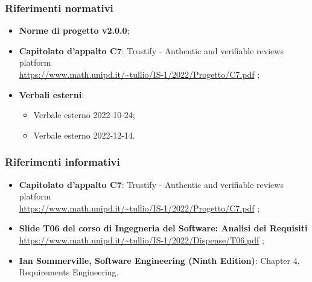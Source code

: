 \subsubsection{Riferimenti normativi}
\begin{itemize}
    \item \textbf{Norme di progetto v2.0.0};
    \item \textbf{Capitolato d'appalto C7}: Trustify - Authentic and verifiable reviews platform \\
          \url{https://www.math.unipd.it/~tullio/IS-1/2022/Progetto/C7.pdf}
          \hfill{};
    \item \textbf{Verbali esterni}:
          \begin{itemize}
              \item Verbale esterno 2022-10-24;
              \item Verbale esterno 2022-12-14.
          \end{itemize}
\end{itemize}
\subsubsection{Riferimenti informativi}
\begin{itemize}
    \item \textbf{Capitolato d'appalto C7}: Trustify - Authentic and verifiable reviews platform \\
          \url{https://www.math.unipd.it/~tullio/IS-1/2022/Progetto/C7.pdf}
          \hfill{};
    \item \textbf{Slide T06 del corso di Ingegneria del Software: Analisi dei Requisiti} \\
          \url{https://www.math.unipd.it/~tullio/IS-1/2022/Dispense/T06.pdf}
          \hfill{};
    \item \textbf{Ian Sommerville, Software Engineering (Ninth Edition)}: Chapter 4, Requirements Engineering.
\end{itemize}